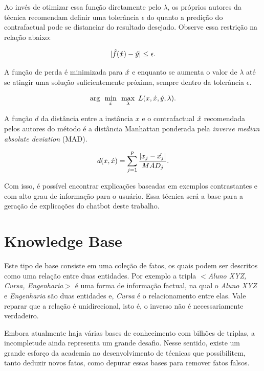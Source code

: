 \documentclass[]{politex}
\begin{document}
Ao invés de otimizar essa função diretamente pelo $\lambda$, os próprios autores da técnica recomendam definir uma tolerância $\epsilon$ do quanto a predição do contrafactual pode se distanciar do resultado desejado. Observe essa restrição na relação abaixo:

\begin{equation}
    |\hat{f}(\Acute{x}) - \Acute{y}| \leq \epsilon.
\end{equation}

A função de perda é minimizada para $\Acute{x}$ e enquanto se aumenta o valor de $\lambda$ até se atingir uma solução suficientemente próxima, sempre dentro da tolerância $\epsilon$. 

\begin{equation}
    \arg\,\,\,\min_{\Acute{x}}\,\,\,\max_{\lambda}\,\,L(x, \Acute{x}, \Acute{y}, \lambda).
\end{equation}

A função $d$ da distância entre a instância $x$ e o contrafactual $\Acute{x}$ recomendada pelos autores do método é a distância Manhattan ponderada pela \textit{inverse median absolute deviation} (MAD).

\begin{equation}
    d(x, \Acute{x}) = \sum_{j=1}^p \frac{|x_{j} - \Acute{x_{j}}|}{MAD_j}.
\end{equation}

Com isso, é possível encontrar explicações baseadas em exemplos contrastantes e com alto grau de informação para o usuário. Essa técnica será a base para a geração de explicações do chatbot deste trabalho. 

\section{Knowledge Base}

Este tipo de base consiste em uma coleção de fatos, os quais podem ser descritos como uma relação entre duas entidades. Por exemplo a tripla $<$\textit{Aluno XYZ, Cursa, Engenharia}$>$ é uma forma de informação factual, na qual o \textit{Aluno XYZ} e \textit{Engenharia} são duas entidades e, \textit{Cursa} é o relacionamento entre elas. Vale reparar que a relação é unidirecional, isto é, o inverso não é necessariamente verdadeiro. 

Embora atualmente haja várias bases de conhecimento com bilhões de triplas, a incompletude ainda representa um grande desafio. Nesse sentido, existe um grande esforço da academia no desenvolvimento de técnicas que possibilitem, tanto deduzir novos fatos, como depurar essas bases para remover fatos falsos. \cite{journals/corr/NickelMTG15}
\end{document}
